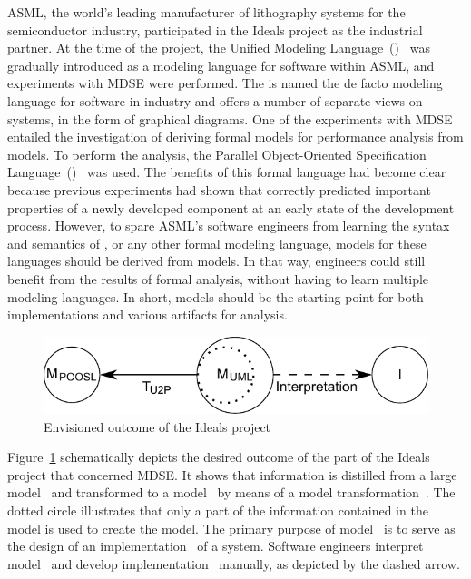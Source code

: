 ASML, the world's leading manufacturer of lithography systems for the semiconductor industry, participated in the Ideals project as the industrial partner.
At the time of the project, the Unified Modeling Language~(\UML)~\cite{UMLsuper} was gradually introduced as a modeling language for software within ASML, and experiments with MDSE were performed.
The \UML is named the de facto modeling language for software in industry and offers a number of separate views on systems, in the form of graphical diagrams.
One of the experiments with MDSE entailed the investigation of deriving formal models for performance analysis from \UML models.
To perform the analysis, the Parallel Object-Oriented Specification Language~(\POOSL)~\cite{Theelen2007} was used.
The benefits of this formal language had become clear because previous experiments had shown that \POOSL correctly predicted important properties of a newly developed component at an early state of the development process.
However, to spare ASML's software engineers from learning the syntax and semantics of \POOSL, or any other formal modeling language, models for these languages should be derived from \UML models.
In that way, engineers could still benefit from the results of formal analysis, without having to learn multiple modeling languages.
In short, \UML models should be the starting point for both implementations and various artifacts for analysis.

\begin{figure}[hbt]
 \centering
 \includegraphics[scale=0.7]{introduction/figs/uml-to-poosl}
 \caption{Envisioned outcome of the Ideals project}
 \label{fig:introduction:ideals}
\end{figure}

Figure~\ref{fig:introduction:ideals} schematically depicts the desired outcome of the part of the Ideals project that concerned MDSE.
It shows that information is distilled from a large \UML model~ and transformed to a \POOSL model~ by means of a model transformation~.
The dotted circle illustrates that only a part of the information contained in the \UML model is used to create the \POOSL model.
The primary purpose of model~ is to serve as the design of an implementation~\Implementation{} of a system.
Software engineers interpret model~ and develop implementation~\Implementation{} manually, as depicted by the dashed arrow.


